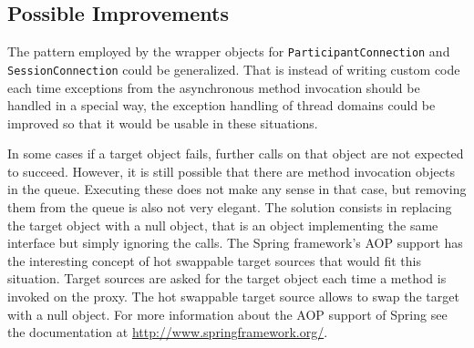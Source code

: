 \subsection{Possible Improvements}
The pattern employed by the wrapper objects for \texttt{ParticipantConnection}
and \texttt{SessionConnection} could be generalized. That is instead of
writing custom code each time exceptions from the asynchronous method invocation
should be handled in a special way, the exception handling of thread domains
could be improved so that it would be usable in these situations.

In some cases if a target object fails, further calls on that object are not
expected to succeed. However, it is still possible that there are method
invocation objects in the queue. Executing these does not make any sense
in that case, but removing them from the queue is also not very elegant.
The solution consists in replacing the target object with a null object, that
is an object implementing the same interface but simply ignoring the calls.
The Spring framework's AOP support has the interesting concept of
hot swappable target sources that would fit this situation. Target sources
are asked for the target object each time a method is invoked on the
proxy. The hot swappable target source allows to swap the target with a
null object. For more information about the AOP support of Spring see
the documentation at 
\href{http://www.springframework.org/}{http://www.springframework.org/}.

